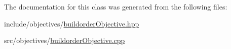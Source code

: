 The documentation for this class was generated from the following files\-:\begin{DoxyCompactItemize}
\item 
include/objectives/\hyperlink{buildorderObjective_8hpp}{buildorder\-Objective.\-hpp}\item 
src/objectives/\hyperlink{buildorderObjective_8cpp}{buildorder\-Objective.\-cpp}\end{DoxyCompactItemize}
